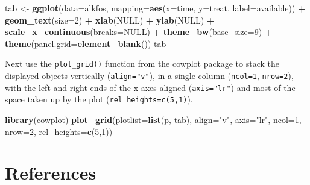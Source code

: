\documentclass[
]{book}
\newenvironment{Shaded}{\begin{snugshade}}{\end{snugshade}}
\newcommand{\AttributeTok}[1]{\textcolor[rgb]{0.13,0.29,0.53}{#1}}
\newcommand{\ConstantTok}[1]{\textcolor[rgb]{0.56,0.35,0.01}{#1}}
\newcommand{\DecValTok}[1]{\textcolor[rgb]{0.00,0.00,0.81}{#1}}
\newcommand{\FunctionTok}[1]{\textcolor[rgb]{0.13,0.29,0.53}{\textbf{#1}}}
\newcommand{\NormalTok}[1]{#1}
\newcommand{\OtherTok}[1]{\textcolor[rgb]{0.56,0.35,0.01}{#1}}
\newcommand{\SpecialCharTok}[1]{\textcolor[rgb]{0.81,0.36,0.00}{\textbf{#1}}}
\newcommand{\StringTok}[1]{\textcolor[rgb]{0.31,0.60,0.02}{#1}}
\begin{document}
\begin{Shaded}
\begin{Highlighting}[]
\NormalTok{tab }\OtherTok{\textless{}{-}} \FunctionTok{ggplot}\NormalTok{(}\AttributeTok{data=}\NormalTok{alkfos, }
              \AttributeTok{mapping=}\FunctionTok{aes}\NormalTok{(}\AttributeTok{x=}\NormalTok{time, }\AttributeTok{y=}\NormalTok{treat, }\AttributeTok{label=}\NormalTok{available)) }\SpecialCharTok{+}
              \FunctionTok{geom\_text}\NormalTok{(}\AttributeTok{size=}\DecValTok{2}\NormalTok{) }\SpecialCharTok{+} \FunctionTok{xlab}\NormalTok{(}\ConstantTok{NULL}\NormalTok{) }\SpecialCharTok{+} \FunctionTok{ylab}\NormalTok{(}\ConstantTok{NULL}\NormalTok{) }\SpecialCharTok{+}
              \FunctionTok{scale\_x\_continuous}\NormalTok{(}\AttributeTok{breaks=}\ConstantTok{NULL}\NormalTok{) }\SpecialCharTok{+} 
              \FunctionTok{theme\_bw}\NormalTok{(}\AttributeTok{base\_size=}\DecValTok{9}\NormalTok{) }\SpecialCharTok{+}
              \FunctionTok{theme}\NormalTok{(}\AttributeTok{panel.grid=}\FunctionTok{element\_blank}\NormalTok{())}
\NormalTok{tab}
\end{Highlighting}
\end{Shaded}

Next use the \texttt{plot\_grid()} function from the cowplot package to stack the displayed objects vertically (\texttt{align="v"}), in a single column (\texttt{ncol=1}, \texttt{nrow=2}), with the left and right ends of the x-axes aligned (\texttt{axis="lr"}) and most of the space taken up by the plot (\texttt{rel\_heights=c(5,1)}).

\begin{Shaded}
\begin{Highlighting}[]
\FunctionTok{library}\NormalTok{(cowplot)}
\FunctionTok{plot\_grid}\NormalTok{(}\AttributeTok{plotlist=}\FunctionTok{list}\NormalTok{(p, tab), }\AttributeTok{align=}\StringTok{"v"}\NormalTok{, }\AttributeTok{axis=}\StringTok{"lr"}\NormalTok{, }
          \AttributeTok{ncol=}\DecValTok{1}\NormalTok{, }\AttributeTok{nrow=}\DecValTok{2}\NormalTok{, }\AttributeTok{rel\_heights=}\FunctionTok{c}\NormalTok{(}\DecValTok{5}\NormalTok{,}\DecValTok{1}\NormalTok{))}
\end{Highlighting}
\end{Shaded}

\section{References}\label{references}
\end{document}
